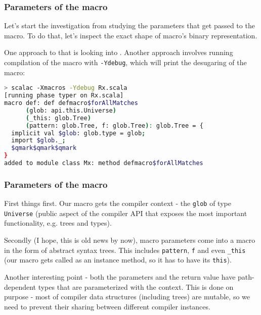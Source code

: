\documentclass[hyperref={bookmarks=false}]{beamer}
\begin{document}
\begin{frame}[t,fragile]
\frametitle{Parameters of the macro}

Let's start the investigation from studying the parameters that get passed to the macro. To do that, let's inspect the exact shape of macro's binary representation.

One approach to that is looking into . Another approach involves running compilation of the macro with \texttt{-Ydebug}, which will print the desugaring of the macro:

\begin{lstlisting}[language=sh]
> scalac -Xmacros -Ydebug Rx.scala
[running phase typer on Rx.scala]
macro def: def defmacro$forAllMatches
      (glob: api.this.Universe)
      (_this: glob.Tree)
      (pattern: glob.Tree, f: glob.Tree): glob.Tree = {
  implicit val $glob: glob.type = glob;
  import $glob._;
  $qmark$qmark$qmark
}
added to module class Mx: method defmacro$forAllMatches
\end{lstlisting}%
\end{frame}

\begin{frame}[t,fragile]
\frametitle{Parameters of the macro}

First things first. Our macro gets the compiler context - the \texttt{glob} of type \texttt{Universe} (public aspect of the compiler API that exposes the most important functionality, e.g. trees and types).

Secondly (I hope, this is old news by now), macro parameters come into a macro in the form of abstract syntax trees. This includes \texttt{pattern}, \texttt{f} and even \texttt{\_this} (our macro gets called as an instance method, so it has to have its \texttt{this}).

Another interesting point - both the parameters and the return value have path-dependent types that are parameterized with the context. This is done on purpose - most of compiler data structures (including trees) are mutable, so we need to prevent their sharing between different compiler instances.
\end{frame}
\end{document}
